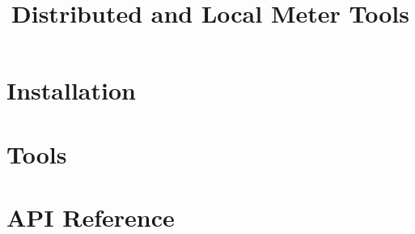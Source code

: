 \documentclass[11pt]{book}
\title{Distributed and Local Meter Tools}
\begin{document}
\maketitle
\tableofcontents

\chapter{Installation}



\chapter{Tools}

\chapter{API Reference}

\end{document}
